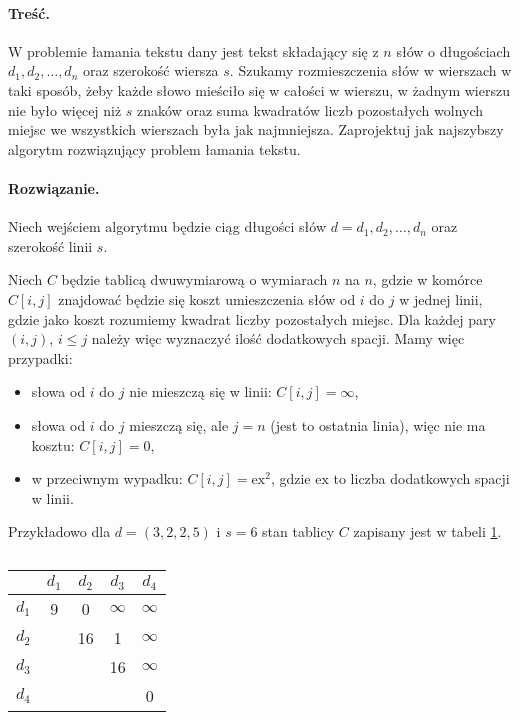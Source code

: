\paragraph{Treść.} W problemie łamania tekstu dany jest tekst składający się z $n$
słów o długościach $d_1, d_2, \ldots , d_n$ oraz
szerokość wiersza $s$. Szukamy rozmieszczenia słów w wierszach w taki 
sposób, żeby każde słowo mieściło się w całości
w wierszu, w żadnym wierszu nie było więcej niż $s$ znaków 
oraz suma kwadratów liczb pozostałych wolnych miejsc we
wszystkich wierszach była jak najmniejsza.
Zaprojektuj jak najszybszy algorytm rozwiązujący problem łamania tekstu.

\paragraph{Rozwiązanie.} Niech wejściem algorytmu będzie ciąg  długości słów $d=d_1,d_2,\dotsc,d_n$ oraz szerokość linii $s$.

Niech $C$ będzie tablicą dwuwymiarową o wymiarach $n$ na $n$, gdzie w komórce $C[i,j]$ znajdować będzie się koszt umieszczenia słów od $i$ do $j$ w jednej linii, gdzie jako koszt rozumiemy kwadrat liczby pozostałych miejsc. Dla każdej pary $(i,j)$, $i\leq j$ należy więc wyznaczyć ilość dodatkowych spacji. Mamy więc przypadki: \begin{itemize}
	\item słowa od $i$ do $j$ nie mieszczą się w linii: $C[i,j]=\infty$,
	\item słowa od $i$ do $j$ mieszczą się, ale $j=n$ (jest to ostatnia linia), więc nie ma kosztu: $C[i,j]=0$,
	\item w przeciwnym wypadku: $C[i,j]=\textrm{ex}^2$, gdzie $\textrm{ex}$ to liczba dodatkowych spacji w linii.
\end{itemize}

Przykładowo dla $d=(3,2,2,5)$ i $s=6$ stan tablicy $C$ zapisany jest w tabeli \ref{tab_zad13_C}.
\begin{table}[H]
	\centering
	\def\arraystretch{1.25}
	\begin{tabular}{|c|cccc|}
		\hline \diagbox{$i$}{$j$}
		& \multicolumn{1}{c|}{$d_1$} & \multicolumn{1}{c|}{$d_2$} & \multicolumn{1}{c|}{$d_3$} & \multicolumn{1}{c|}{$d_4$} \\ \hline
		$d_1$ & 9 & 0  & $\infty$ & $\infty$ \\ \cline{1-1}
		$d_2$ &   & 16 &        1 & $\infty$ \\ \cline{1-1}
		$d_3$ &   &    &       16 & $\infty$ \\ \cline{1-1}
		$d_4$ &   &    &          &        0 \\ \cline{1-1}
		\hline
	\end{tabular}
	\caption{}
	\label{tab_zad13_C}
\end{table}

